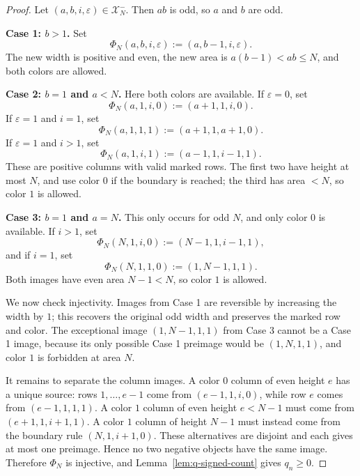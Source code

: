 \documentclass[11pt]{article}
\newcommand{\calX}{\mathcal{X}}
\begin{document}
\begin{proof}
Let $(a,b,i,\varepsilon)\in\calX_N^-$.  Then $ab$ is odd, so $a$ and $b$ are odd.

\medskip
\noindent\textbf{Case 1: $b>1$.}
Set
\[
  \Phi_N(a,b,i,\varepsilon):=(a,b-1,i,\varepsilon).
\]
The new width is positive and even, the new area is $a(b-1)<ab\leq N$, and both colors are allowed.

\medskip
\noindent\textbf{Case 2: $b=1$ and $a<N$.}
Here both colors are available.  If $\varepsilon=0$, set
\[
  \Phi_N(a,1,i,0):=(a+1,1,i,0).
\]
If $\varepsilon=1$ and $i=1$, set
\[
  \Phi_N(a,1,1,1):=(a+1,1,a+1,0).
\]
If $\varepsilon=1$ and $i>1$, set
\[
  \Phi_N(a,1,i,1):=(a-1,1,i-1,1).
\]
These are positive columns with valid marked rows.  The first two have height at most $N$, and use color $0$ if the boundary is reached; the third has area $<N$, so color $1$ is allowed.

\medskip
\noindent\textbf{Case 3: $b=1$ and $a=N$.}
This only occurs for odd $N$, and only color $0$ is available.  If $i>1$, set
\[
  \Phi_N(N,1,i,0):=(N-1,1,i-1,1),
\]
and if $i=1$, set
\[
  \Phi_N(N,1,1,0):=(1,N-1,1,1).
\]
Both images have even area $N-1<N$, so color $1$ is allowed.

We now check injectivity.  Images from Case 1 are reversible by increasing the width by $1$; this recovers the original odd width and preserves the marked row and color.  The exceptional image $(1,N-1,1,1)$ from Case 3 cannot be a Case 1 image, because its only possible Case 1 preimage would be $(1,N,1,1)$, and color $1$ is forbidden at area $N$.

It remains to separate the column images.  A color $0$ column of even height $e$ has a unique source: rows $1,\ldots,e-1$ come from $(e-1,1,i,0)$, while row $e$ comes from $(e-1,1,1,1)$.  A color $1$ column of even height $e<N-1$ must come from $(e+1,1,i+1,1)$.  A color $1$ column of height $N-1$ must instead come from the boundary rule $(N,1,i+1,0)$.  These alternatives are disjoint and each gives at most one preimage.  Hence no two negative objects have the same image.  Therefore $\Phi_N$ is injective, and Lemma~\ref{lem:q-signed-count} gives $q_n\geq0$.
\end{proof}
\end{document}

